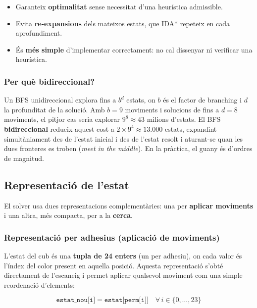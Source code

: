 \documentclass[12pt, a4paper]{article}
\begin{document}
\begin{itemize}
  \item Garanteix \textbf{optimalitat} sense necessitat d'una heurística admissible.
  \item Evita \textbf{re-expansions} dels mateixos estats, que IDA* repeteix en cada aprofundiment.
  \item És \textbf{més simple} d'implementar correctament: no cal dissenyar ni verificar una heurística.
\end{itemize}

\subsubsection{Per què bidireccional?}

Un BFS unidireccional explora fins a $b^d$ estats, on $b$ és el factor de branching i $d$ la profunditat de la solució. Amb $b = 9$ moviments i solucions de fins a $d = 8$ moviments, el pitjor cas seria explorar $9^8 \approx 43$ milions d'estats. El BFS \textbf{bidireccional} redueix aquest cost a $2 \times 9^4 \approx 13.000$ estats, expandint simultàniament des de l'estat inicial i des de l'estat resolt i aturant-se quan les dues fronteres es troben (\textit{meet in the middle}). En la pràctica, el guany és d'ordres de magnitud.

\subsection{Representació de l'estat}

El solver usa dues representacions complementàries: una per \textbf{aplicar moviments} i una altra, més compacta, per a la \textbf{cerca}.

\subsubsection{Representació per adhesius (aplicació de moviments)}

L'estat del cub és una \textbf{tupla de 24 enters} (un per adhesiu), on cada valor és l'índex del color present en aquella posició. Aquesta representació s'obté directament de l'escaneig i permet aplicar qualsevol moviment com una simple reordenació d'elements:

\begin{equation*}
  \texttt{estat\_nou[i]} = \texttt{estat[perm[i]]}
  \quad \forall\, i \in \{0, \ldots, 23\}
\end{equation*}
\end{document}
